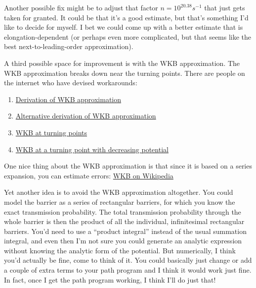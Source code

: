 \documentclass[]{report}
\begin{document}
Another possible fix might be to adjust that factor $n=10^{20.38} s^{-1}$ that just gets taken for granted. It could be that it's a good estimate, but that's something I'd like to decide for myself. I bet we could come up with a better estimate that is elongation-dependent (or perhaps even more complicated, but that seems like the best next-to-leading-order approximation).

A third possible space for improvement is with the WKB approximation. The WKB approximation breaks down near the turning points. There are people on the internet who have devised workarounds:

\begin{enumerate}
\item \href{http://www.physicspages.com/2014/07/03/wkb-approximation-tunneling/}{Derivation of WKB approximation}
\item \href{http://www.physicspages.com/2014/06/30/wkb-approximation-alternative-derivation/}{Alternative derivation of WKB approximation}
\item \href{http://www.physicspages.com/2014/07/09/wkb-approximation-turning-points/}{WKB at turning points}
\item \href{http://www.physicspages.com/2014/07/14/wkb-approximation-at-a-turning-point-with-decreasing-potential/}{WKB at a turning point with decreasing potential}
\end{enumerate}

\noindent One nice thing about the WKB approximation is that since it is based on a series expansion, you can estimate errors: \href{https://en.wikipedia.org/wiki/WKB_approximation#Precision_of_the_asymptotic_series}{WKB on Wikipedia}

Yet another idea is to avoid the WKB approximation altogether. You could model the barrier as a series of rectangular barriers, for which you know the exact transmission probability. The total transmission probability through the whole barrier is then the product of all the individual, infinitesimal rectangular barriers. You'd need to use a ``product integral'' instead of the usual summation integral, and even then I'm not sure you could generate an analytic expression without knowing the analytic form of the potential. But numerically, I think you'd actually be fine, come to think of it. You could basically just change or add a couple of extra terms to your path program and I think it would work just fine. In fact, once I get the path program working, I think I'll do just that!
\end{document}
